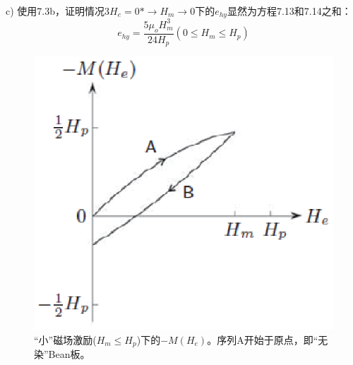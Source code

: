 c) 使用7.3b，证明情况3$H_e=0*\rightarrow H_m\rightarrow 0$下的$e_{hy}$显然为方程7.13和7.14之和：
\begin{equation}%
e_{hy}=\frac{5\mu_oH_{m}^{3}}{24H_p}      (0\leq H_m\leq H_p)
\end{equation}
\begin{figure}[htbp]
	\centering
	\includegraphics[scale=0.7]{chpt7/figs/fig7.10.eps}
	\caption{“小”磁场激励($H_m\le H_p$)下的$-M(H_e)$。序列A开始于原点，即“无染”Bean板。}
\end{figure}

